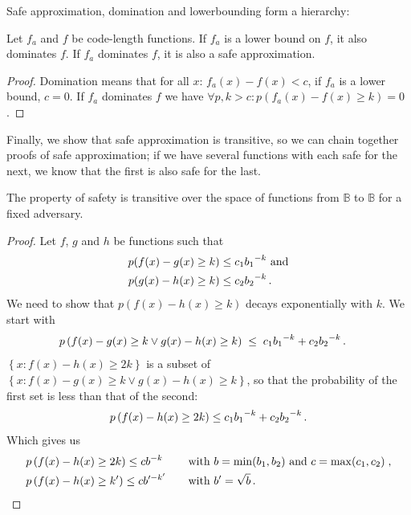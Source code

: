 \noindent Safe approximation, domination and lowerbounding form a hierarchy:

\begin{lemma}
Let $f_a$ and $f$ be code-length functions. If $f_a$ is a lower bound on $f$, it also dominates $f$. If $f_a$ dominates $f$, it is also a safe approximation.
\label{lemma:domination-safety}
\end{lemma}
\begin{proof}
Domination means that for all $x$: $f_a(x) - f(x) < c$, if $f_a$ is a lower bound, $c=0$. If $f_a$ dominates $f$ we have  
$\forall p, k > c : p(f_a(x) - f(x) \geq k) = 0$.
\end{proof}
Finally, we show that safe approximation is transitive, so we can chain together proofs of safe approximation; if we have several functions with each safe for the next, we know that the first is also safe for the last.

\begin{lemma}
The property of safety is transitive over the space of functions from $\mathbb B$ to $\mathbb B$ for a fixed adversary.
\label{lemma:reflexitvity}
\end{lemma}
\begin{proof} Let $f$, $g$ and $h$ be functions such that 
\begin{align*}
p(f(x) - g(x) \geq k) &\leq c_1{b_1}^{-k} \text{ and}\\
p(g(x) - h(x) \geq k) &\leq c_2{b_2}^{-k} \,\text{.}
\end{align*}
We need to show that $p(f(x) - h(x) \geq k)$ decays exponentially with $k$. We start with
\begin{align*}
p\left(f(x) - g(x) \geq k \vee g(x) - h(x) \geq k\right)\;&\leq\;c_1{b_1}^{-k} + c_2{b_2}^{-k}\,\text{.}
\end{align*}
$\left\{x : f(x) - h(x) \geq 2k\right\}$ is a subset of $\left\{x : f(x) - g(x) \geq k\vee g(x) - h(x) \geq k\right\}$, so that the probability of the first set is less than that of the second:
\begin{align*}
p\left(f(x) - h(x) \geq 2k\right) \leq c_1{b_1}^{-k} + c_2{b_2}^{-k} \,\text{.}
\end{align*}
Which gives us \belowdisplayskip=-12pt
\begin{align*}
&p\left(f(x) - h(x) \geq 2k\right)\leq cb^{-k} \quad&& \text{with $b=\min(b_1, b_2)$ and $c = \max(c_1, c_2)$} \;,\\
&p\left(f(x) - h(x) \geq k'\right)\leq cb'^{-k'} \quad&& \text{with $b'=\sqrt{b}$}\,\text{.}
\end{align*} 
\end{proof}

